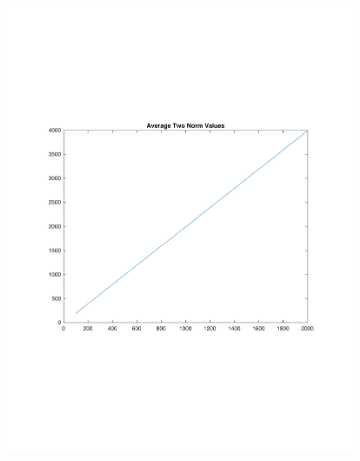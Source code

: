 \documentclass{article}
\begin{document}
\begin{figure}[H]
\begin{subfigure}{0.48\textwidth}
\includegraphics[width=\linewidth]{two}
\end{subfigure}


\end{figure}
\end{document}

